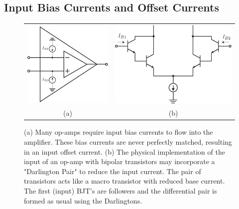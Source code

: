 \subsection{Input Bias Currents and Offset Currents}
\begin{figure}[tb]
\centering
\begin{tabular}{cc}
\includegraphics[scale=1.05]{opamp_offset_I} &
\includegraphics[scale=1.05]{bjt_input_darlington}\\
(a) & (b)\\
\end{tabular}
\caption{(a) Many op-amps require input bias currents to flow into the amplifier.  These bias currents are never perfectly matched, resulting in an input offset current. (b) The physical implementation of the input of an op-amp with bipolar transistors may incorporate a "Darlington Pair" to reduce the input current. The pair of transistors acts like a macro transistor with reduced base current. The first (input) BJT's are followers and the differential pair is formed as usual using the Darlingtons.}
\label{fig:opamp_offset_I}
\end{figure}
